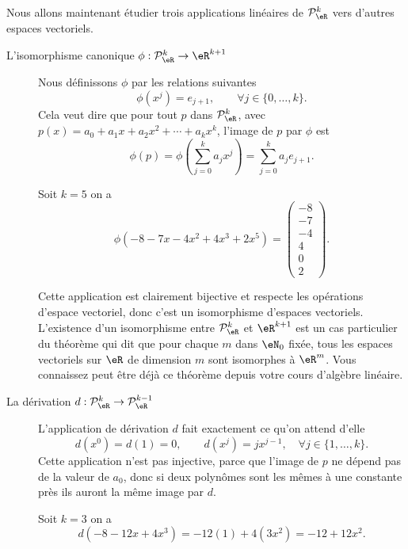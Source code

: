 Nous allons maintenant étudier trois applications linéaires de \( \mathcal{P}_\eR^k\) vers d'autres espaces vectoriels.
\begin{description}
	\item[L'isomorphisme canonique  \( \phi:\mathcal{P}_\eR^k \to\eR^{k+1}\)] Nous définissons \( \phi\) par les relations suivantes
	      \[
		      \phi(x^j)=e_{j+1}, \qquad \forall j\in\{0,\dots, k\}.
	      \]
	      Cela veut dire que pour tout \( p\) dans \( \mathcal{P}_\eR^k\), avec \( p(x)=a_0+a_1 x +a_2 x^2 + \cdots+a_k x^k\), l'image de \( p\) par \( \phi\) est
	      \[
		      \phi(p)=\phi\left(\sum_{j=0}^k a_j x^j\right)=\sum_{j=0}^k a_j e_{j+1}.
	      \]
	      \begin{example} Soit \( k=5\) on a
		      \begin{equation}
			      \phi(-8-7x-4x^2+4x^3+2x^5)=
			      \begin{pmatrix}
				      -8 \\
				      -7 \\
				      -4 \\
				      4  \\
				      0  \\
				      2
			      \end{pmatrix}.
		      \end{equation}
	      \end{example}

	      Cette application est clairement bijective et respecte les opérations d'espace vectoriel, donc c'est un isomorphisme d'espaces vectoriels. L'existence d'un isomorphisme entre \( \mathcal{P}_\eR^k\)  et \( \eR^{k+1}\) est un cas particulier du théorème qui dit que  pour chaque \( m\) dans \( \eN_0\) fixée, tous les espaces vectoriels sur \( \eR\) de dimension \( m\) sont isomorphes à \( \eR^m\). Vous connaissez peut être déjà ce théorème depuis votre cours d'algèbre linéaire.
	\item[La dérivation \( d: \mathcal{P}_\eR^k \to \mathcal{P}_\eR^{k-1}\)] L'application de dérivation \( d\) fait exactement ce qu'on attend d'elle
	      \[
		      d(x^0)=d(1)=0, \qquad d(x^j)=j x^{j-1}, \quad \forall j\in\{1,\dots, k\}.
	      \]
	      Cette application n'est pas injective, parce que l'image de \( p\) ne dépend pas de la valeur de \( a_0\), donc si deux polynômes sont les mêmes à une constante près ils auront la même image par \( d\).

	      \begin{example} Soit \( k=3\) on a
		      \begin{equation}
			      d(-8-12x+4x^3)= -12 (1) + 4 (3x^2) = -12+12 x^2.
		      \end{equation}


\end{example}
\end{description}
